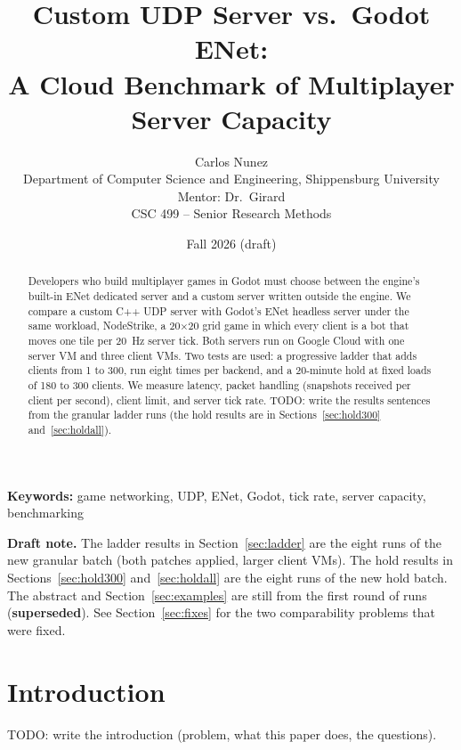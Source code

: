 \title{Custom UDP Server vs.\ Godot ENet:\\[0.5ex]A Cloud Benchmark of Multiplayer Server Capacity}
\author{Carlos Nunez\\
Department of Computer Science and Engineering, Shippensburg University\\
Mentor: Dr.\ Girard\\
CSC 499 -- Senior Research Methods}
\date{Fall 2026 (draft)}


\maketitle

\begin{abstract}
Developers who build multiplayer games in Godot must choose between the engine's built-in
ENet dedicated server and a custom server written outside the engine. We compare a custom C++ UDP
server with Godot's ENet headless server under the same workload, NodeStrike, a 20×20 grid game
in which every client is a bot that moves one tile per 20~Hz server tick. Both servers run on
Google Cloud with one server VM and three client VMs. Two tests are used: a progressive
ladder that adds clients from 1 to 300, run eight times per backend, and a 20-minute hold at fixed loads of 180 to 300
clients. We measure latency, packet handling (snapshots received per client per second), client limit, and server
tick rate. TODO: write the results sentences from the granular ladder runs (the hold results are in Sections~\ref{sec:hold300} and~\ref{sec:holdall}).
\end{abstract}

\noindent\textbf{Keywords:} game networking, UDP, ENet, Godot, tick rate, server capacity, benchmarking

\noindent\colorbox{red!12}{\parbox{\dimexpr\textwidth-2\fboxsep\relax}{\textbf{Draft note.} The ladder results in Section~\ref{sec:ladder} are the eight runs of the new granular batch (both patches applied, larger client VMs). The hold results in Sections~\ref{sec:hold300} and~\ref{sec:holdall} are the eight runs of the new hold batch. The abstract and Section~\ref{sec:examples} are still from the first round of runs (\textbf{superseded}). See Section~\ref{sec:fixes} for the two comparability problems that were fixed.}}

\section{Introduction}
TODO: write the introduction (problem, what this paper does, the questions).


